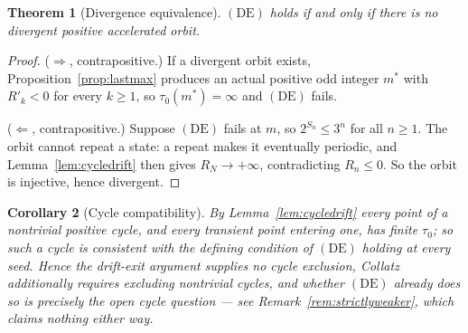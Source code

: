 \documentclass[11pt]{article}
\theoremstyle{plain}
\newtheorem{theorem}{Theorem}[section]
\newtheorem{corollary}[theorem]{Corollary}
\theoremstyle{definition}
\theoremstyle{remark}
\begin{document}
\begin{theorem}[Divergence equivalence]\label{thm:DEequiv}
$(\mathrm{DE})$ holds if and only if there is no divergent positive accelerated orbit.
\end{theorem}

\begin{proof}
($\Rightarrow$, contrapositive.) If a divergent orbit exists, Proposition~\ref{prop:lastmax}
produces an actual positive odd integer $m^*$ with $R'_k<0$ for every $k\ge1$, so
$\tau_0(m^*)=\infty$ and $(\mathrm{DE})$ fails.

($\Leftarrow$, contrapositive.) Suppose $(\mathrm{DE})$ fails at $m$, so $2^{S_n}\le3^n$ for all
$n\ge1$. The orbit cannot repeat a state: a repeat makes it eventually periodic, and
Lemma~\ref{lem:cycledrift} then gives $R_N\to+\infty$, contradicting $R_n\le0$. So the orbit is
injective, hence divergent.
\end{proof}

\begin{corollary}[Cycle compatibility]\label{cor:cycles}
By Lemma~\ref{lem:cycledrift} every point of a nontrivial positive cycle, and every transient point
entering one, has finite $\tau_0$; so such a cycle is consistent with the defining condition of
$(\mathrm{DE})$ holding at every seed. Hence the drift-exit argument supplies no cycle exclusion,
Collatz additionally requires excluding nontrivial cycles, and whether $(\mathrm{DE})$ already does
so is precisely the open cycle question --- see Remark~\ref{rem:strictlyweaker}, which claims
nothing either way.
\end{corollary}
\end{document}
